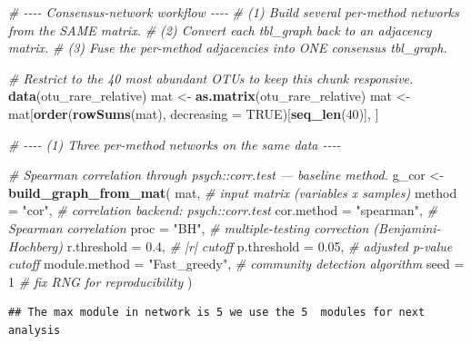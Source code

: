 \documentclass[
]{book}
\newenvironment{Shaded}{\begin{snugshade}}{\end{snugshade}}
\newcommand{\AttributeTok}[1]{\textcolor[rgb]{0.13,0.29,0.53}{#1}}
\newcommand{\CommentTok}[1]{\textcolor[rgb]{0.56,0.35,0.01}{\textit{#1}}}
\newcommand{\ConstantTok}[1]{\textcolor[rgb]{0.56,0.35,0.01}{#1}}
\newcommand{\DecValTok}[1]{\textcolor[rgb]{0.00,0.00,0.81}{#1}}
\newcommand{\FloatTok}[1]{\textcolor[rgb]{0.00,0.00,0.81}{#1}}
\newcommand{\FunctionTok}[1]{\textcolor[rgb]{0.13,0.29,0.53}{\textbf{#1}}}
\newcommand{\NormalTok}[1]{#1}
\newcommand{\OtherTok}[1]{\textcolor[rgb]{0.56,0.35,0.01}{#1}}
\newcommand{\StringTok}[1]{\textcolor[rgb]{0.31,0.60,0.02}{#1}}
\begin{document}
\begin{Shaded}
\begin{Highlighting}[]
\CommentTok{\# {-}{-}{-}{-} Consensus{-}network workflow {-}{-}{-}{-}}
\CommentTok{\# (1) Build several per{-}method networks from the SAME matrix.}
\CommentTok{\# (2) Convert each tbl\_graph back to an adjacency matrix.}
\CommentTok{\# (3) Fuse the per{-}method adjacencies into ONE consensus tbl\_graph.}

\CommentTok{\# Restrict to the 40 most abundant OTUs to keep this chunk responsive.}
\FunctionTok{data}\NormalTok{(otu\_rare\_relative)}
\NormalTok{mat }\OtherTok{\textless{}{-}} \FunctionTok{as.matrix}\NormalTok{(otu\_rare\_relative)}
\NormalTok{mat }\OtherTok{\textless{}{-}}\NormalTok{ mat[}\FunctionTok{order}\NormalTok{(}\FunctionTok{rowSums}\NormalTok{(mat), }\AttributeTok{decreasing =} \ConstantTok{TRUE}\NormalTok{)[}\FunctionTok{seq\_len}\NormalTok{(}\DecValTok{40}\NormalTok{)], ]}

\CommentTok{\# {-}{-}{-}{-} (1) Three per{-}method networks on the same data {-}{-}{-}{-}}

\CommentTok{\# Spearman correlation through psych::corr.test — baseline method.}
\NormalTok{g\_cor   }\OtherTok{\textless{}{-}} \FunctionTok{build\_graph\_from\_mat}\NormalTok{(}
\NormalTok{  mat,                              }\CommentTok{\# input matrix (variables x samples)}
  \AttributeTok{method        =} \StringTok{"cor"}\NormalTok{,            }\CommentTok{\# correlation backend: psych::corr.test}
  \AttributeTok{cor.method    =} \StringTok{"spearman"}\NormalTok{,       }\CommentTok{\# Spearman correlation}
  \AttributeTok{proc          =} \StringTok{"BH"}\NormalTok{,             }\CommentTok{\# multiple{-}testing correction (Benjamini{-}Hochberg)}
  \AttributeTok{r.threshold   =} \FloatTok{0.4}\NormalTok{,              }\CommentTok{\# |r| cutoff}
  \AttributeTok{p.threshold   =} \FloatTok{0.05}\NormalTok{,             }\CommentTok{\# adjusted p{-}value cutoff}
  \AttributeTok{module.method =} \StringTok{"Fast\_greedy"}\NormalTok{,    }\CommentTok{\# community detection algorithm}
  \AttributeTok{seed          =} \DecValTok{1}                 \CommentTok{\# fix RNG for reproducibility}
\NormalTok{)}
\end{Highlighting}
\end{Shaded}

\begin{verbatim}
## The max module in network is 5 we use the 5  modules for next analysis
\end{verbatim}
\end{document}
